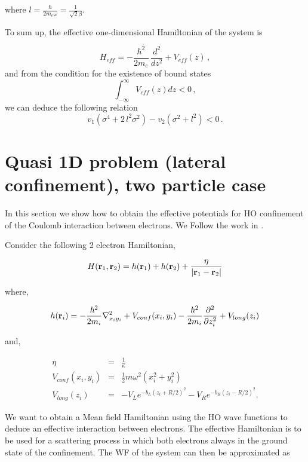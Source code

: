 \documentclass[a4paper,10pt]{article}
\begin{document}
\noindent where $l = \frac{\hbar}{2 m_e \omega} = \frac{1}{\sqrt{2}\beta}$.

To sum up, the effective one-dimensional Hamiltonian of the system is

\begin{equation}
  H_{eff} = -\frac{\hbar^2}{2 m_e}\,\frac{d^2}{dz^2} + V_{eff}(z)\,,
\end{equation}
\noindent and from the condition for the existence of bound states
\begin{equation}
  \int_{-\infty}^{\infty} V_{eff}(z) dz < 0\,,
\end{equation}
\noindent we can deduce the following relation
\begin{equation}
  v_1\left(\sigma^4 + 2\, l^2 \sigma^2\right) - v_2\left(\sigma^2 + l^2\right)<0\,.
\end{equation}

\section*{Quasi 1D problem (lateral confinement), two particle case}
In this section we show how to obtain the effective potentials for HO confinement of the
Coulomb interaction between electrons. We Follow the work
in \cite{bednarek_effective_2003}.

Consider the following 2 electron Hamiltonian,


\begin{equation}
H(\mathbf{r}_1, \mathbf{r}_2) = h(\mathbf{r}_1) + h(\mathbf{r}_2) +
\frac{\eta}{\left|\mathbf{r}_1-\mathbf{r}_2\right|}
\end{equation}

where,

\begin{equation}
h(\mathbf{r}_i) = -\frac{\hbar^2}{2 m_i}\nabla^2_{x_i y_i} + V_{conf}(x_i,y_i) - \frac{\hbar^2}{2
m_i}\frac{\partial^2}{\partial z_i^2} + V_{long}(z_i)
\end{equation}

and,

\begin{eqnarray}
\eta &=& \frac{1}{\kappa} \\
V_{conf}(x_i,y_i) &=& \frac{1}{2}m\omega^2(x^{2}_i + y^{2}_i) \\
V_{long}(z_i) &=& - V_L e^{-b_L (z_i + R/2)^2} - V_R e^{-b_R (z_i - R/2)^{2}}.
\end{eqnarray}

We want to obtain a Mean field Hamiltonian using the HO wave functions to deduce
an effective interaction between electrons. The effective Hamiltonian is to be used
for a scattering process in which both electrons always in the ground state of the
confinement. The WF of the system can then
be approximated as
\end{document}
